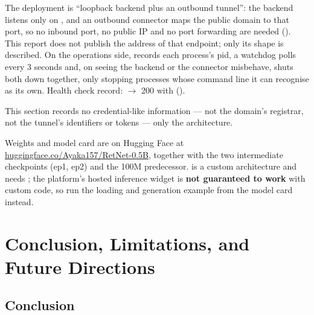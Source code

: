 The deployment is ``loopback backend plus an outbound tunnel'': the backend listens only on
, and an outbound connector maps the public domain to that port, so no
inbound port, no public IP and no port forwarding are needed (). This
report does not publish the address of that endpoint; only its shape is described. On the
operations side,  records each process's pid, a watchdog polls every
3 seconds and, on seeing the backend or the connector misbehave, shuts both down together, only
stopping processes whose command line it can recognise as its own. Health check record:
 $\rightarrow$ 200 with
 ().

This section records no credential-like information --- not the domain's registrar, not the
tunnel's identifiers or tokens --- only the architecture.

Weights and model card are on Hugging Face at
\href{https://huggingface.co/Ayaka157/RetNet-0.5B}{huggingface.co/Ayaka157/RetNet-0.5B}, together
with the two intermediate checkpoints (ep1, ep2) and the 100M predecessor. 
is a custom architecture and needs ; the platform's hosted inference
widget is \textbf{not guaranteed to work} with custom code, so run the loading and generation
example from the model card instead.

\section{Conclusion, Limitations, and Future Directions}

\subsection{Conclusion}

